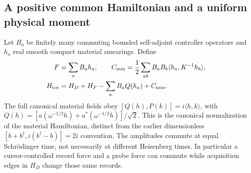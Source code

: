 \subsection{A positive common Hamiltonian and a uniform physical moment}

Let $B_a$ be finitely many commuting bounded self-adjoint controller
operators and $h_a$ real smooth compact material smearings. Define
\begin{align}
 F&=\sum_a B_a h_a,\qquad
 C_{\min}=\frac12\sum_{ab}B_aB_b
                    \langle h_a,K^{-1}h_b\rangle,\nonumber\\
 H_{\rm tot}&=H_D+H_F-\sum_aB_aQ(h_a)+C_{\min}.
 \label{eq:quantum-material-H}
\end{align}
The full canonical material fields obey
$[Q(h),P(k)]=i\langle h,k\rangle$, with
$Q(h)=[a(\omega^{-1/2}h)+a^*(\omega^{-1/2}h)]/\sqrt2$.
This is the canonical normalization of the material Hamiltonian,
distinct from the earlier dimensionless $[b+b^\dagger,
i(b^\dagger-b)]=2i$ convention.
The amplitudes commute at equal Schr\"odinger time, not necessarily
at different Heisenberg times. In particular a cursor-controlled
record force and a probe force can commute while acquisition edges in
$H_D$ change those same records.

